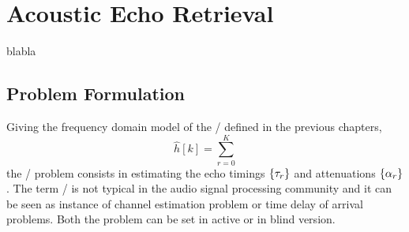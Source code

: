 \chapter{Acoustic Echo Retrieval}\label{chap:estimation}
\vspace{-2.5em}
  blabla

\section{Problem Formulation}
Giving the frequency domain model of the \RIR/ defined in the previous chapters,
\begin{equation}
    \hat{h}[k] = \sum_{r=0}^K
\end{equation}
the \AER/ problem consists in estimating the echo timings $\kbrace{\tau_r}$ and attenuations $\kbrace{\alpha_r}$.
The term \AER/ is not typical in the audio signal processing community and it can be seen as instance of
channel estimation problem or time delay of arrival problems.
Both the problem can be set in active or in blind version.


